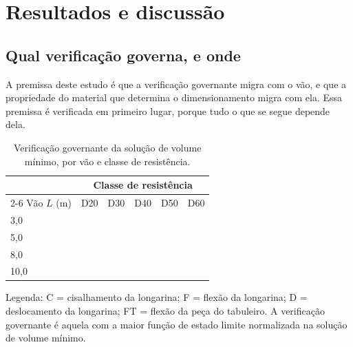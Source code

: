 \section{Resultados e discussão}\label{sec:results}

\subsection{Qual verificação governa, e onde}\label{sec:governante}

A premissa deste estudo é que a verificação governante migra com o vão, e que a propriedade do material que determina o dimensionamento migra com ela. Essa premissa é verificada em primeiro lugar, porque tudo o que se segue depende dela.

\begin{table}[!ht]
\caption{Verificação governante da solução de volume mínimo, por vão e classe de resistência.\label{tab:governante}}
\begin{threeparttable}
\begin{tabular*}{\columnwidth}{@{\extracolsep\fill}lccccc@{\extracolsep\fill}}
\toprule
 & \multicolumn{5}{c}{Classe de resistência} \\
\cmidrule{2-6}
Vão $L$ (m) & D20 & D30 & D40 & D50 & D60 \\
\midrule
3,0 & \tofill{--} & \tofill{--} & \tofill{--} & \tofill{--} & \tofill{--} \\
5,0 & \tofill{--} & \tofill{--} & \tofill{--} & \tofill{--} & \tofill{--} \\
8,0 & \tofill{--} & \tofill{--} & \tofill{--} & \tofill{--} & \tofill{--} \\
10,0 & \tofill{--} & \tofill{--} & \tofill{--} & \tofill{--} & \tofill{--} \\
\bottomrule
\end{tabular*}
\begin{tablenotes}
\footnotesize
\item Legenda: C = cisalhamento da longarina; F = flexão da longarina; D = deslocamento da longarina; FT = flexão da peça do tabuleiro. A verificação governante é aquela com a maior função de estado limite normalizada na solução de volume mínimo.
\end{tablenotes}
\end{threeparttable}
\end{table}

